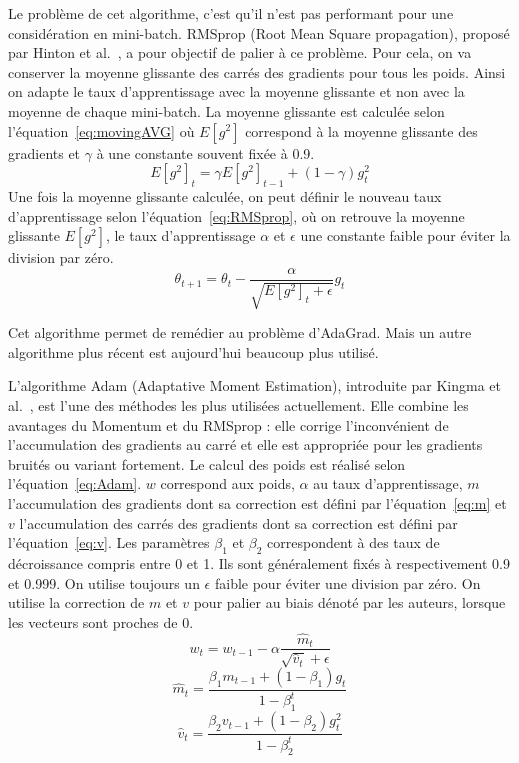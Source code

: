 Le problème de cet algorithme, c'est qu'il n'est pas performant pour une considération en mini-batch. RMSprop (Root Mean Square propagation), proposé par Hinton et al.~\cite{Hinton2013}, a pour objectif de palier à ce problème. Pour cela, on va conserver la moyenne glissante des carrés des gradients pour tous les poids. Ainsi on adapte le taux d'apprentissage avec la moyenne glissante et non avec la moyenne de chaque mini-batch. La moyenne glissante est calculée selon l'équation~\ref{eq:movingAVG} où $E[g^{2}]$ correspond à la moyenne glissante des gradients et $\gamma$ à une constante souvent fixée à 0.9.
\begin{equation}
  E\left[g^{2}\right]_{t} = \gamma E\left[g^{2}\right]_{t-1} + \left(1 - \gamma\right) g^{2}_{t}
  \label{eq:movingAVG}
\end{equation}
Une fois la moyenne glissante calculée, on peut définir le nouveau taux d'apprentissage selon l'équation~\ref{eq:RMSprop}, où on retrouve la moyenne glissante $E[g^{2}]$, le taux d'apprentissage $\alpha$ et $\epsilon$ une constante faible pour éviter la division par zéro.
\begin{equation}
  \theta_{t+1} = \theta_{t} - \frac{\alpha}{\sqrt{E\left[g^{2}\right]_{t} + \epsilon}}g_{t}
  \label{eq:RMSprop}
\end{equation}

Cet algorithme permet de remédier au problème d'AdaGrad. Mais un autre algorithme plus récent est aujourd'hui beaucoup plus utilisé.

L'algorithme Adam (Adaptative Moment Estimation), introduite par Kingma et al.~\cite{Kingma2015}, est l'une des méthodes les plus utilisées actuellement. Elle combine les avantages du Momentum et du RMSprop : elle corrige l'inconvénient de l'accumulation des gradients au carré et elle est appropriée pour les gradients bruités ou variant fortement. Le calcul des poids est réalisé selon l'équation~\ref{eq:Adam}. $w$ correspond aux poids, $\alpha$ au taux d'apprentissage, $m$ l'accumulation des gradients dont sa correction est défini par l'équation~\ref{eq:m} et $v$ l'accumulation des carrés des gradients dont sa correction est défini par l'équation~\ref{eq:v}. Les paramètres $\beta_{1}$ et $\beta_{2}$ correspondent à des taux de décroissance compris entre 0 et 1. Ils sont généralement fixés à respectivement 0.9 et 0.999. On utilise toujours un $\epsilon$ faible pour éviter une division par zéro. On utilise la correction de $m$ et $v$ pour palier au biais dénoté par les auteurs, lorsque les vecteurs sont proches de 0.
\begin{equation}
  w_{t} = w_{t-1} - \alpha\frac{\hat{m}_{t}}{\sqrt{\hat{v}_{t}} + \epsilon}
  \label{eq:Adam}
\end{equation}
\begin{equation}
  \hat{m}_{t} = \frac{\beta_{1}m_{t-1} + (1-\beta_{1})g_{t}}{1-\beta^{t}_{1}}
  \label{eq:m}
\end{equation}
\begin{equation}
  \hat{v}_{t} = \frac{\beta_{2}v_{t-1} + (1-\beta_{2})g_{t}^{2}}{1-\beta^{t}_{2}}
  \label{eq:v}
\end{equation}

